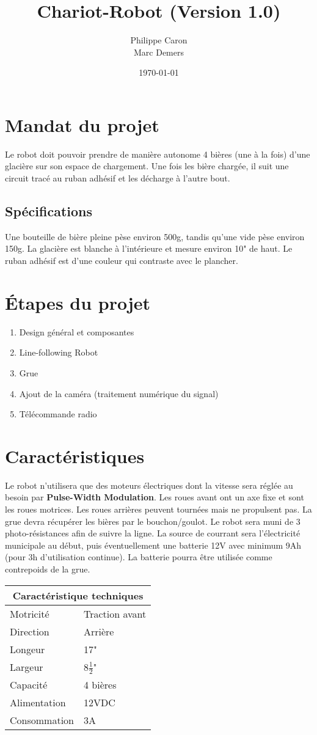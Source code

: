 \documentclass{article}
\title{Chariot-Robot (Version 1.0)} %
\author{Philippe Caron\\
        Marc Demers}
\date{\today}
\newcommand{\key}[1]{{\bf #1}}
\begin{document}
\maketitle
\section{Mandat du projet}
Le robot doit pouvoir prendre de manière autonome 4 bières (une à la fois) d'une glacière sur son espace de chargement. Une fois les bière chargée, il suit une circuit tracé au ruban adhésif et les décharge à l'autre bout.
\subsection{Spécifications}
Une bouteille de bière pleine pèse environ 500g, tandis qu'une vide pèse environ 150g.
La glacière est blanche à l'intérieure et mesure environ 10" de haut.
Le ruban adhésif est d'une couleur qui contraste avec le plancher.
\section{Étapes du projet}
\begin{enumerate}
\item Design général et composantes
\item Line-following Robot
\item Grue
\item Ajout de la caméra (traitement numérique du signal)
\item Télécommande radio
\end{enumerate}
\section{Caractéristiques}
Le robot n'utilisera que des moteurs électriques dont la vitesse sera réglée au besoin par \key{Pulse-Width Modulation}. Les roues avant ont un axe fixe et sont les roues motrices. Les roues arrières peuvent tournées mais ne propulsent pas. La grue devra récupérer les bières par le bouchon/goulot. Le robot sera muni de 3 photo-résistances afin de suivre la ligne. La source de courrant sera l'électricité municipale au début, puis éventuellement une batterie 12V avec minimum 9Ah (pour 3h d'utilisation continue). La batterie pourra être utilisée comme contrepoids de la grue.

\begin{center}
\begin{tabular}{l|l}
  \multicolumn{2}{c}{Caractéristique techniques}
   \\\hline \hline
  Motricité    & Traction avant \\
  Direction    & Arrière \\
  Longeur      & 17" \\
  Largeur      & 8$\frac{1}{2}$" \\
  Capacité     & 4 bières \\
  Alimentation & 12VDC \\
  Consommation & 3A \\
\end{tabular}
\end{center}
\end{document}
